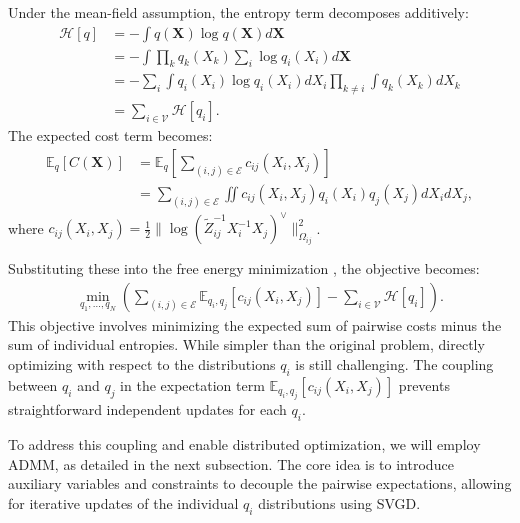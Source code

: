 Under the mean-field assumption, the entropy term decomposes additively:
\begin{equation}
\begin{aligned}
{\mathcal{H}}[q] &= -\int q({\mathbf{X}}) \log q({\mathbf{X}}) d{\mathbf{X}} \\
&= -\int \prod_k q_k(X_k) \sum_i \log q_i(X_i) d{\mathbf{X}} \\
&= -\sum_i \int q_i(X_i) \log q_i(X_i) dX_i \prod_{k \neq i} \int q_k(X_k) dX_k \\
&= \sum_{i \in {\mathcal{V}}} {\mathcal{H}}[q_i].
\label{eq:entropy_mean_field}
\end{aligned}
\end{equation}
The expected cost term becomes:
\begin{equation}
\begin{aligned}
\mathbb{E}_q[C({\mathbf{X}})] &= \mathbb{E}_q \left[ \sum_{(i,j) \in {\mathcal{E}}} c_{ij}(X_i, X_j) \right] \\
&= \sum_{(i,j) \in {\mathcal{E}}} \iint c_{ij}(X_i, X_j) q_i(X_i) q_j(X_j) dX_i dX_j,
\label{eq:expected_cost_mean_field}
\end{aligned}
\end{equation}
where $c_{ij}(X_i, X_j) = \frac{1}{2} \| \log({\tilde{Z}}_{ij}^{-1} X_i^{-1} X_j)^{\vee} \|^2_{\Omega_{ij}}$.

Substituting these into the free energy minimization , the objective becomes:
\begin{equation}
\begin{aligned}
\min_{q_1, \dots, q_N} \left( \sum_{(i,j) \in {\mathcal{E}}} \mathbb{E}_{q_i, q_j}[c_{ij}(X_i, X_j)] - \sum_{i \in {\mathcal{V}}} {\mathcal{H}}[q_i] \right).
\label{eq:kl_min_mean_field}
\end{aligned}
\end{equation}
This objective involves minimizing the expected sum of pairwise costs minus the sum of individual entropies. While simpler than the original problem, directly optimizing  with respect to the distributions $q_i$ is still challenging. The coupling between $q_i$ and $q_j$ in the expectation term $\mathbb{E}_{q_i, q_j}[c_{ij}(X_i, X_j)]$ prevents straightforward independent updates for each $q_i$.

To address this coupling and enable distributed optimization, we will employ ADMM, as detailed in the next subsection. The core idea is to introduce auxiliary variables and constraints to decouple the pairwise expectations, allowing for iterative updates of the individual $q_i$ distributions using SVGD.

